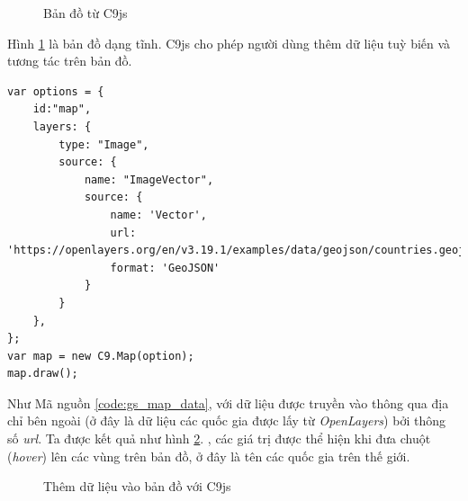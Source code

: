 \documentclass[12pt,a4paper]{article}
\begin{document}
\begin{figure}[!h]
	\begin{center}
    \caption{Bản đồ từ C9js}
    \label{fig:gs_3}
	\end{center}
\end{figure}

Hình \ref{fig:gs_3} là bản đồ dạng tĩnh. C9js cho phép người dùng thêm dữ liệu tuỳ biến và tương tác trên bản đồ.

\begin{lstlisting}[caption=Thêm dữ liệu vào Bản đồ với C9js, label={code:gs_map_data}]
var options = {  
    id:"map",
    layers: {
        type: "Image",
        source: {
            name: "ImageVector",
            source: {
                name: 'Vector',
                url: 'https://openlayers.org/en/v3.19.1/examples/data/geojson/countries.geojson',
                format: 'GeoJSON'   
            }
        }
    },
};
var map = new C9.Map(option);
map.draw();
\end{lstlisting}

Như Mã nguồn \ref{code:gs_map_data}, với dữ liệu được truyền vào thông qua địa chỉ bên ngoài (ở đây là dữ liệu các quốc gia được lấy từ \textit{OpenLayers}) bởi thông số \textit{url}. Ta được kết quả như hình \ref{fig:gs_4}. , các giá trị được thể hiện khi đưa chuột (\textit{hover}) lên các vùng trên bản đồ, ở đây là tên các quốc gia trên thế giới.

\begin{figure}[!h]
	\begin{center}
    \caption{Thêm dữ liệu vào bản đồ với C9js}
    \label{fig:gs_4}
	\end{center}
\end{figure}
\end{document}
